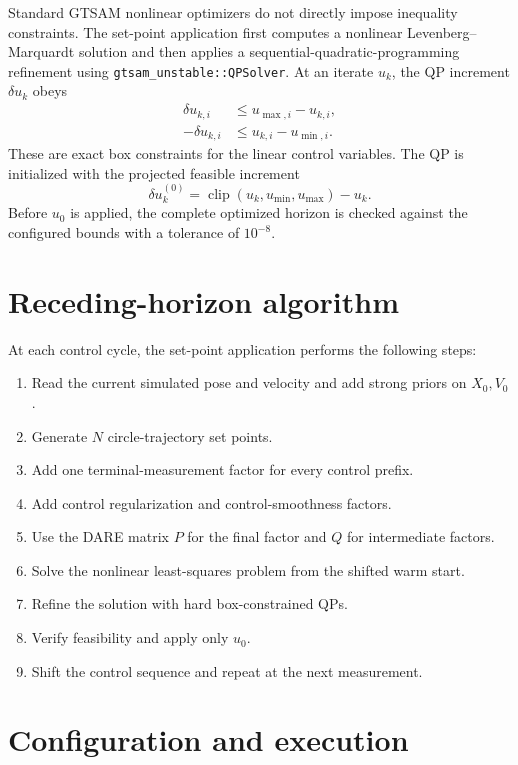 \documentclass[11pt]{article}
\begin{document}
Standard GTSAM nonlinear optimizers do not directly impose inequality constraints.  The set-point
application first computes a nonlinear Levenberg--Marquardt solution and then applies a
sequential-quadratic-programming refinement using
\texttt{gtsam\_unstable::QPSolver}.  At an iterate $u_k$, the QP increment $\delta u_k$ obeys
\begin{align}
 \delta u_{k,i} &\leq u_{\max,i}-u_{k,i},\\
-\delta u_{k,i} &\leq u_{k,i}-u_{\min,i}.
\end{align}
These are exact box constraints for the linear control variables.  The QP is initialized with the
projected feasible increment
\begin{equation}
\delta u_k^{(0)}=\operatorname{clip}(u_k,u_{\min},u_{\max})-u_k.
\end{equation}
Before $u_0$ is applied, the complete optimized horizon is checked against the configured bounds
with a tolerance of $10^{-8}$.

\section{Receding-horizon algorithm}

At each control cycle, the set-point application performs the following steps:
\begin{enumerate}
  \item Read the current simulated pose and velocity and add strong priors on $X_0,V_0$.
  \item Generate $N$ circle-trajectory set points.
  \item Add one terminal-measurement factor for every control prefix.
  \item Add control regularization and control-smoothness factors.
  \item Use the DARE matrix $P$ for the final factor and $Q$ for intermediate factors.
  \item Solve the nonlinear least-squares problem from the shifted warm start.
  \item Refine the solution with hard box-constrained QPs.
  \item Verify feasibility and apply only $u_0$.
  \item Shift the control sequence and repeat at the next measurement.
\end{enumerate}

\section{Configuration and execution}
\end{document}
